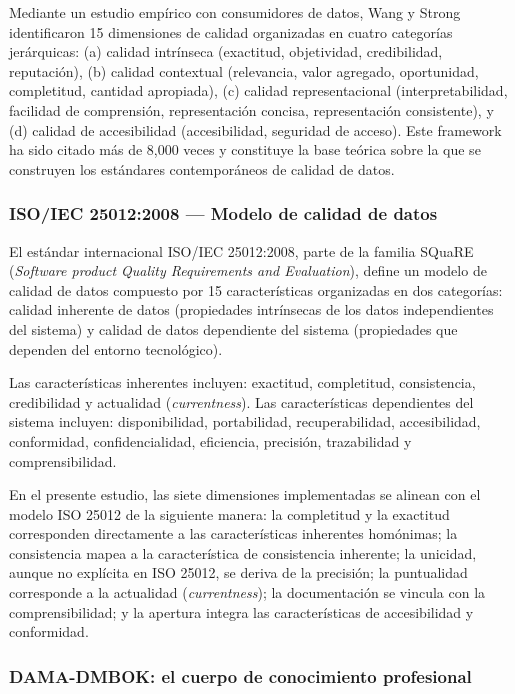 \documentclass[12pt,letterpaper]{article}
\begin{document}
Mediante un estudio empírico con consumidores de datos, Wang y Strong identificaron 15 dimensiones de calidad organizadas en cuatro categorías jerárquicas: (a) calidad intrínseca (exactitud, objetividad, credibilidad, reputación), (b) calidad contextual (relevancia, valor agregado, oportunidad, completitud, cantidad apropiada), (c) calidad representacional (interpretabilidad, facilidad de comprensión, representación concisa, representación consistente), y (d) calidad de accesibilidad (accesibilidad, seguridad de acceso). Este framework ha sido citado más de 8,000 veces y constituye la base teórica sobre la que se construyen los estándares contemporáneos de calidad de datos.

\subsubsection{ISO/IEC 25012:2008 --- Modelo de calidad de datos}

El estándar internacional ISO/IEC 25012:2008, parte de la familia SQuaRE (\textit{Software product Quality Requirements and Evaluation}), define un modelo de calidad de datos compuesto por 15 características organizadas en dos categorías: calidad inherente de datos (propiedades intrínsecas de los datos independientes del sistema) y calidad de datos dependiente del sistema (propiedades que dependen del entorno tecnológico).

Las características inherentes incluyen: exactitud, completitud, consistencia, credibilidad y actualidad (\textit{currentness}). Las características dependientes del sistema incluyen: disponibilidad, portabilidad, recuperabilidad, accesibilidad, conformidad, confidencialidad, eficiencia, precisión, trazabilidad y comprensibilidad.

En el presente estudio, las siete dimensiones implementadas se alinean con el modelo ISO 25012 de la siguiente manera: la completitud y la exactitud corresponden directamente a las características inherentes homónimas; la consistencia mapea a la característica de consistencia inherente; la unicidad, aunque no explícita en ISO 25012, se deriva de la precisión; la puntualidad corresponde a la actualidad (\textit{currentness}); la documentación se vincula con la comprensibilidad; y la apertura integra las características de accesibilidad y conformidad.

\subsubsection{DAMA-DMBOK: el cuerpo de conocimiento profesional}
\end{document}
